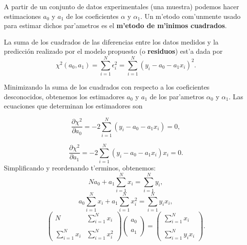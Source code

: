 A partir de un conjunto de datos experimentales (una muestra) podemos hacer estimaciones $a_0$ y $a_1$ de los coeficientes $\alpha$ y $\alpha_1$.
Un m'etodo com'unmente usado para estimar dichos par'ametros es el \textbf{m'etodo de m'inimos cuadrados}. 
%

La suma de los cuadrados de las diferencias entre los datos medidos y la predicción realizado por el modelo propuesto (o \textbf{residuos}) est'a dada por
\begin{equation}
\chi^2(a_0,a_1)= \sum_{i=1}^N\epsilon_{i}^{2}= \sum_{i=1}^N (y_{i} - a_0 - a_1 x_{i})^{2}.
\end{equation}

Minimizando la suma de los cuadrados con respecto a los coeficientes desconocidos, obtenemos los estimadores $a_0$ y $a_1$ de los par'ametros $\alpha_0$ y $\alpha_1$. Las ecuaciones que determinan los estimadores son

\begin{equation}\label{dchi2db0}
\frac{\partial \chi^2}{\partial a_0}=-2 \sum_{i=1}^N (y_{i} - a_0 - a_1 x_{i})=0,
\end{equation}

\begin{equation}
\frac{\partial \chi^2}{\partial a_1}=-2 \sum_{i=1}^N (y_{i} - a_0 - a_1 x_{i})x_i=0.
\end{equation}
Simplificando y reordenando t'erminos, obtenemos:
\begin{equation}
N a_0 + a_1\sum_{i=1}^N x_{i}=\sum_{i=1}^N y_{i},
\end{equation}
\begin{equation}
a_0\sum_{i=1}^N x_{i}  + a_1\sum_{i=1}^N x_{i}^{2}=\sum_{i=1}^N y_{i}x_{i},
\end{equation}
\begin{equation}
\left( \begin{array} {cc}
N&\sum_{i=1}^N x_{i} \\  \\
\sum_{i=1}^N x_{i}&\sum_{i=1}^N x_{i}^{2} 
 \end{array}\right) \left( \begin{array} {c}
 a_0 \\  \\
 a_1 
  \end{array}\right)=\left( \begin{array} {c}
   \sum_{i=1}^N x_{i} \\  \\
   \sum_{i=1}^N y_{i}x_{i} 
    \end{array}\right).
\end{equation}


